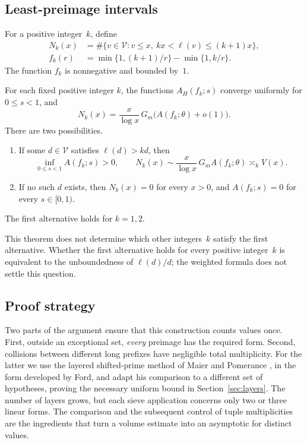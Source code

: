 \subsection{Least-preimage intervals}
For a positive integer~$k$, define
\begin{equation}\label{eq:fk}
 \begin{aligned}
 N_k(x)&=\#\{v\in\mathcal V:v\le x,\ kx<\ell(v)\le(k+1)x\},\\
 f_k(r)&=\min\{1,(k+1)/r\}-\min\{1,k/r\}.
 \end{aligned}
\end{equation}
The function $f_k$ is nonnegative and bounded by~$1$.

\begin{theorem}\label{thm:companion}
For each fixed positive integer $k$, the functions $A_H(f_k;s)$ converge uniformly for $0\le s<1$, and
\[
 N_k(x)=\frac{x}{\log x}\,G_m\bigl(A(f_k;\theta)+o(1)\bigr).
\]
There are two possibilities.
\begin{enumerate}[label=\textup{(\roman*)}]
 \item If some $d\in\mathcal V$ satisfies $\ell(d)>kd$, then
 \[
  \inf_{0\le s<1}A(f_k;s)>0,\qquad
  N_k(x)\sim\frac{x}{\log x}\,G_m A(f_k;\theta)
       \asymp_k V(x).
 \]
 \item If no such $d$ exists, then $N_k(x)=0$ for every $x>0$, and $A(f_k;s)=0$ for every $s\in[0,1)$.
\end{enumerate}
The first alternative holds for $k=1,2$.
\end{theorem}

This theorem does not determine which other integers~$k$ satisfy the first alternative. Whether the first alternative holds for every positive integer~$k$ is equivalent to the unboundedness of $\ell(d)/d$; the weighted formula does not settle this question.

\subsection{Proof strategy}
Two parts of the argument ensure that this construction counts values once. First, outside an exceptional set, \emph{every} preimage has the required form. Second, collisions between different long prefixes have negligible total multiplicity. For the latter we use the layered shifted-prime method of
Maier and Pomerance \cite[Section~3]{MaierPomerance1988}, in the form
developed by Ford, and adapt his comparison \cite[Lemma~5.1]{FordTotients2013} to a different set of hypotheses, proving the necessary uniform bound in Section~\ref{sec:layers}. The number of layers grows, but each sieve application concerns only two or three linear forms. The comparison and the subsequent control of tuple multiplicities are the ingredients that turn a volume estimate into an asymptotic for distinct values.

